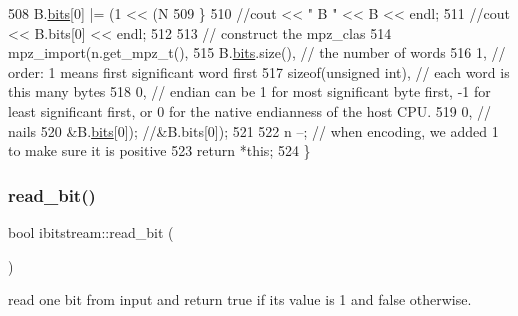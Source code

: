 \begin{DoxyCode}
508     B.\hyperlink{classbit__pipe_a86f38af1e9736b053728033490476b50}{bits}[0] |= (1 << (N %
509   \}
510   \textcolor{comment}{//cout << " B " << B << endl;}
511   \textcolor{comment}{//cout << B.bits[0] << endl;}
512 
513   \textcolor{comment}{// construct the mpz\_clas}
514   mpz\_import(n.get\_mpz\_t(),
515              B.\hyperlink{classbit__pipe_a86f38af1e9736b053728033490476b50}{bits}.size(), \textcolor{comment}{// the number of words}
516              1, \textcolor{comment}{// order: 1 means first significant word first}
517              \textcolor{keyword}{sizeof}(\textcolor{keywordtype}{unsigned} int), \textcolor{comment}{// each word is this many bytes}
518              0, \textcolor{comment}{// endian can be 1 for most significant byte first, -1 for least significant first, or 0
       for the native endianness of the host CPU.}
519              0, \textcolor{comment}{// nails}
520              &B.\hyperlink{classbit__pipe_a86f38af1e9736b053728033490476b50}{bits}[0]); \textcolor{comment}{//&B.bits[0]);}
521 
522   n --; \textcolor{comment}{// when encoding, we added 1 to make sure it is positive}
523   \textcolor{keywordflow}{return} *\textcolor{keyword}{this};
524 \}
\end{DoxyCode}
\mbox{\label{classibitstream_a895239acf7179f6778388c39c97643e4}} 
\subsubsection{\texorpdfstring{read\+\_\+bit()}{read\_bit()}}
{\footnotesize\ttfamily bool ibitstream\+::read\+\_\+bit (\begin{DoxyParamCaption}{ }\end{DoxyParamCaption})}



read one bit from input and return true if its value is 1 and false otherwise. 


